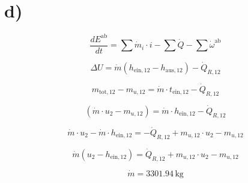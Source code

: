 

\section*{d)}

\begin{equation*}
\frac{dE^{\text{ab}}}{dt} = \sum \dot{m}_i \cdot i - \sum \dot{Q} - \sum \dot{\omega}^{\text{ab}}
\end{equation*}

\begin{equation*}
\Delta U = \dot{m} (h_{\text{ein},12} - h_{\text{aus},12}) - \dot{Q}_{R,12}
\end{equation*}

\begin{equation*}
m_{\text{tot},12} - m_{u,12} = \dot{m} \cdot t_{\text{ein},12} - \dot{Q}_{R,12}
\end{equation*}

\begin{equation*}
(\dot{m} \cdot u_2 - m_{u,12}) = \dot{m} \cdot h_{\text{ein},12} - \dot{Q}_{R,12}
\end{equation*}

\begin{equation*}
\dot{m} \cdot u_2 - \dot{m} \cdot h_{\text{ein},12} = - \dot{Q}_{R,12} + m_{u,12} \cdot u_2 - m_{u,12}
\end{equation*}

\begin{equation*}
\dot{m} (u_2 - h_{\text{ein},12}) = \dot{Q}_{R,12} + m_{u,12} \cdot u_2 - m_{u,12}
\end{equation*}

\begin{equation*}
\boxed{\dot{m} = 3301.94 \, \text{kg}}
\end{equation*}